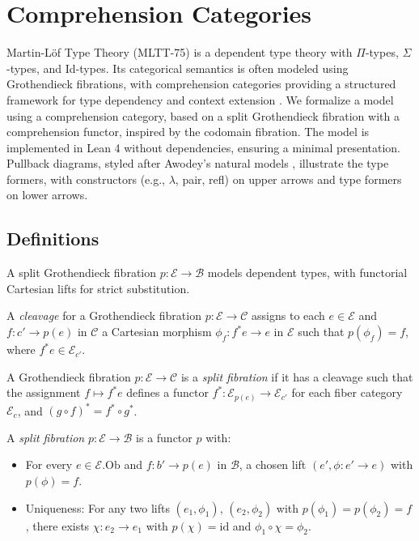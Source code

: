 \documentclass{article}
\begin{document}
\section{Comprehension Categories}
Martin-Löf Type Theory (MLTT-75) is a dependent type theory with $\Pi$-types, $\Sigma$-types, and Id-types. Its categorical semantics is often modeled using Grothendieck fibrations, with comprehension categories providing a structured framework for type dependency and context extension \cite{ncatlab, jacobs1993}. We formalize a model using a comprehension category, based on a split Grothendieck fibration with a comprehension functor, inspired by the codomain fibration. The model is implemented in Lean 4 without dependencies, ensuring a minimal presentation. Pullback diagrams, styled after Awodey’s natural models \cite{awodey}, illustrate the type formers, with constructors (e.g., $\lambda$, pair, refl) on upper arrows and type formers on lower arrows.

\newpage
\subsection{Definitions}
A split Grothendieck fibration $p : \mathcal{E} \to \mathcal{B}$ models dependent types, with functorial Cartesian lifts for strict substitution.


\begin{definition}[Cleavage]
A \emph{cleavage} for a Grothendieck fibration \(p : \mathcal{E} \to \mathcal{C}\) assigns
to each \(e \in \mathcal{E}\) and \(f : c' \to p(e)\) in \(\mathcal{C}\) a Cartesian
morphism \(\phi_f : f^*e \to e\) in \(\mathcal{E}\) such that \(p(\phi_f) = f\), where \(f^*e \in \mathcal{E}_{c'}\).
\end{definition}

\begin{definition}
A Grothendieck fibration \(p : \mathcal{E} \to \mathcal{C}\) is
a \emph{split fibration} if it has a cleavage such that the
assignment \(f \mapsto f^*e\) defines a functor \(f^* : \mathcal{E}_{p(e)} \to \mathcal{E}_{c'}\)
for each fiber category \(\mathcal{E}_c\), and \((g \circ f)^* = f^* \circ g^*\).
\end{definition}

\begin{definition}
A \emph{split fibration} $p : \mathcal{E} \to \mathcal{B}$ is a functor $p$ with:
\begin{itemize}
  \item For every $e \in \mathcal{E}.\text{Ob}$ and $f : b' \to p(e)$ in $\mathcal{B}$, a chosen lift $(e', \phi : e' \to e)$ with $p(\phi) = f$.
  \item Uniqueness: For any two lifts $(e_1, \phi_1)$, $(e_2, \phi_2)$ with $p(\phi_1) = p(\phi_2) = f$, there exists $\chi : e_2 \to e_1$ with $p(\chi) = \text{id}$ and $\phi_1 \circ \chi = \phi_2$.
\end{itemize}
\end{definition}
\end{document}
